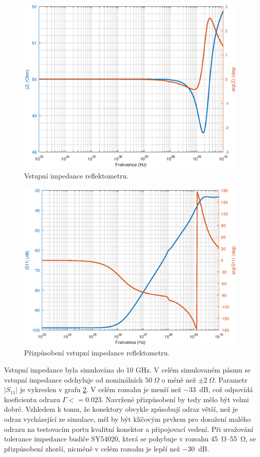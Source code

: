 \begin{figure}[htbp]
\includegraphics[width=\textwidth,keepaspectratio]{images/input_impedance.eps}\caption{Vstupní impedance reflektometru.}\label{input_impedance}
\end{figure}

\begin{figure}[htbp]
\includegraphics[width=\textwidth,keepaspectratio]{images/input_reflection.eps}\caption{Přizpůsobení vstupní impedance reflektometru.}\label{input_reflection}
\end{figure}

Vstupní impedance byla simulována do 10 GHz. V celém simulovaném pásmu se vstupní impedance odchyluje od nominálních $50~\Omega$ o méně než $\pm2~\Omega$. Parametr $\lvert S_\mathrm{11} \rvert$ je vykreslen v grafu \ref{input_reflection}. V celém rozsahu je menší než \SI{-33}{\deci\bel}, což odpovídá koeficientu odrazu $\Gamma <= 0.023$. Navržené přizpůsobení by tedy mělo být velmi dobré. Vzhledem k tomu, že konektory obvykle způsobují odraz větší, než je odraz vycházející ze simulace, měl by být klíčovým prvkem pro dosažení malého odrazu na testovacím portu kvalitní konektor a připojovací vedení. Při uvažování tolerance impedance budiče SY54020, která se pohybuje v rozsahu \SIrange{45}{55}{\ohm}, se přizpůsobení zhorší, nicméně v celém rozsahu je lepší než \SI{-30}{\deci\bel}.

